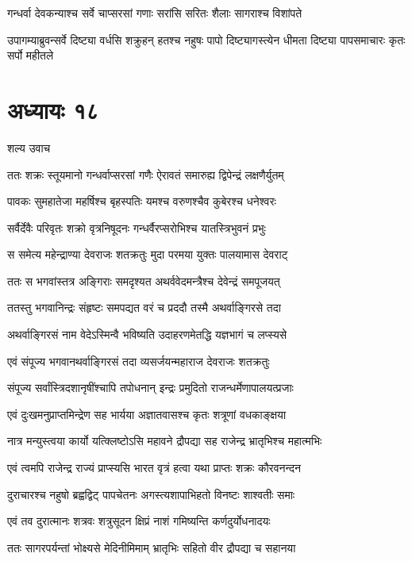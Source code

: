 \twolineshloka
{गन्धर्वा देवकन्याश्च सर्वे चाप्सरसां गणाः}
{सरांसि सरितः शैलाः सागराश्च विशांपते}


\threelineshloka
{उपागम्याब्रुवन्सर्वे दिष्ट्या वर्धसि शक्रुहन्}
{हतश्च नहुषः पापो दिष्ट्यागस्त्येन धीमता}
{दिष्ट्या पापसमाचारः कृतः सर्पो महीतले}


\chapter{अध्यायः १८}
\twolineshloka
{शल्य उवाच}
{}


\twolineshloka
{ततः शक्रः स्तूयमानो गन्धर्वाप्सरसां गणैः}
{ऐरावतं समारुह्य द्विपेन्द्रं लक्षणैर्युतम्}


\twolineshloka
{पावकः सुमहातेजा महर्षिश्च बृहस्पतिः}
{यमश्च वरुणश्चैव कुबेरश्च धनेश्वरः}


\twolineshloka
{सर्वैर्देवैः परिवृतः शक्रो वृत्रनिषूदनः}
{गन्धर्वैरप्सरोभिश्च यातस्त्रिभुवनं प्रभुः}


\twolineshloka
{स समेत्य महेन्द्राण्या देवराजः शतक्रतुः}
{मुदा परमया युक्तः पालयामास देवराट्}


\twolineshloka
{ततः स भगवांस्तत्र अङ्गिराः समदृश्यत}
{अथर्ववेदमन्त्रैश्च देवेन्द्रं समपूजयत्}


\twolineshloka
{ततस्तु भगवानिन्द्रः संहृष्टः समपद्यत}
{वरं च प्रददौ तस्मै अथर्वाङ्गिरसे तदा}


\threelineshloka
{अथर्वाङ्गिरसं नाम वेदेऽस्मिन्वै भविष्यति}
{उदाहरणमेतद्धि यज्ञभागं च लप्स्यसे}
{}


\twolineshloka
{एवं संपूज्य भगवानथर्वाङ्गिरसं तदा}
{व्यसर्जयन्महाराज देवराजः शतक्रतुः}


\twolineshloka
{संपूज्य सर्वांस्त्रिदशानृषींश्चापि तपोधनान्}
{इन्द्रः प्रमुदितो राजन्धर्मेणापालयत्प्रजाः}


\twolineshloka
{एवं दुःखमनुप्राप्तमिन्द्रेण सह भार्यया}
{अज्ञातवासश्च कृतः शत्रूणां वधकाङ्क्षया}


\twolineshloka
{नात्र मन्युस्त्वया कार्यो यत्क्लिष्टोऽसि महावने}
{द्रौपद्या सह राजेन्द्र भ्रातृभिश्च महात्मभिः}


\twolineshloka
{एवं त्वमपि राजेन्द्र राज्यं प्राप्स्यसि भारत}
{वृत्रं हत्वा यथा प्राप्तः शक्रः कौरवनन्दन}


\twolineshloka
{दुराचारश्च नहुषो ब्रह्वद्विट् पापचेतनः}
{अगस्त्यशापाभिहतो विनष्टः शाश्वतीः समाः}


\twolineshloka
{एवं तव दुरात्मानः शत्रवः शत्रुसूदन}
{क्षिप्रं नाशं गमिष्यन्ति कर्णदुर्योधनादयः}


\twolineshloka
{ततः सागरपर्यन्तां भोक्ष्यसे मेदिनीमिमाम्}
{भ्रातृभिः सहितो वीर द्रौपद्या च सहानया}


